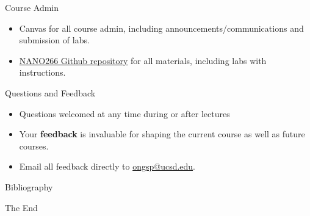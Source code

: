 \documentclass[aspectratio=169]{beamer}
\begin{document}
    \begin{frame}{Course Admin}
        \begin{itemize}
            \item Canvas for all course admin, including announcements/communications and submission of labs.
            \item \href{https://materialsvirtuallab.github.io/nano266/}{NANO266 Github repository} for all materials, including labs with instructions.
        \end{itemize}
    \end{frame}


    \begin{frame}{Questions and Feedback}
        \begin{itemize}
            \item Questions welcomed at any time during or after lectures
            \item Your \textbf{feedback} is invaluable for shaping the current course as well as future courses.
            \item Email all feedback directly to \href{mailto:ongsp@ucsd.edu}{ongsp@ucsd.edu}.
        \end{itemize}
    \end{frame}

    \begin{frame}[allowframebreaks]{Bibliography}
        
        
    \end{frame}



    \begin{frame}
        \Huge{\centerline{The End}}
    \end{frame}
\end{document}
